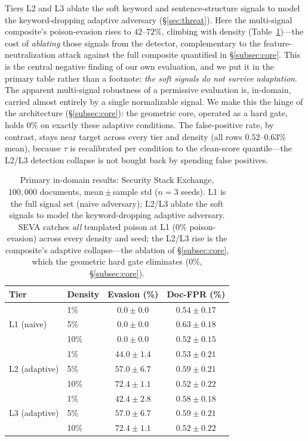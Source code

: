 \documentclass[10pt,journal,compsoc]{IEEEtran}
\begin{document}
Tiers L2 and L3 ablate the soft keyword and sentence-structure signals to model
the keyword-dropping adaptive adversary (\S\ref{sec:threat}). Here the multi-signal
composite's poison-evasion rises to $42$--$72\%$, climbing with density
(Table~\ref{tab:main})---the cost of \emph{ablating} those signals from the detector,
complementary to the feature-neutralization attack against the full composite quantified
in \S\ref{subsec:core}.
This is the central negative finding of our own evaluation, and we put it in the
primary table rather than a footnote: \emph{the soft signals do not survive
adaptation}. The apparent multi-signal robustness of a permissive evaluation is,
in-domain, carried almost entirely by a single normalizable signal. We make this
the hinge of the architecture (\S\ref{subsec:core}): the geometric core, operated
as a hard gate, holds $0\%$ on exactly these adaptive conditions. The
false-positive rate, by contrast, stays near target across every tier and density
(all rows $0.52$--$0.63\%$ mean), because $\tau$ is recalibrated per condition to
the clean-score quantile---the L2/L3 detection collapse is not bought back by
spending false positives.

\begin{table}[t]
\centering
\caption{Primary in-domain results: Security Stack Exchange, $100{,}000$
documents, mean\,$\pm$\,sample std ($n=3$ seeds). L1 is the full signal set (naive
adversary); L2/L3 ablate the soft signals to model the keyword-dropping adaptive
adversary. SEVA catches \emph{all} templated poison at L1 ($0\%$ poison-evasion)
across every density and seed; the L2/L3 rise is the composite's adaptive collapse---the
ablation of \S\ref{subsec:core}, which the geometric hard gate eliminates
($0\%$, \S\ref{subsec:core}).}
\label{tab:main}
\begin{tabular}{llcc}
\toprule
Tier & Density & Evasion (\%) & Doc-FPR (\%) \\
\midrule
\multirow{3}{*}{L1 (naive)}    & 1\%  & $\mathbf{0.0\pm0.0}$ & $0.54\pm0.17$ \\
                               & 5\%  & $\mathbf{0.0\pm0.0}$ & $0.63\pm0.18$ \\
                               & 10\% & $\mathbf{0.0\pm0.0}$ & $0.52\pm0.15$ \\
\midrule
\multirow{3}{*}{L2 (adaptive)} & 1\%  & $44.0\pm1.4$ & $0.53\pm0.21$ \\
                               & 5\%  & $57.0\pm6.7$ & $0.59\pm0.21$ \\
                               & 10\% & $72.4\pm1.1$ & $0.52\pm0.22$ \\
\midrule
\multirow{3}{*}{L3 (adaptive)} & 1\%  & $42.4\pm2.8$ & $0.58\pm0.18$ \\
                               & 5\%  & $57.0\pm6.7$ & $0.59\pm0.21$ \\
                               & 10\% & $72.4\pm1.1$ & $0.52\pm0.22$ \\
\bottomrule
\end{tabular}
\end{table}
\end{document}
